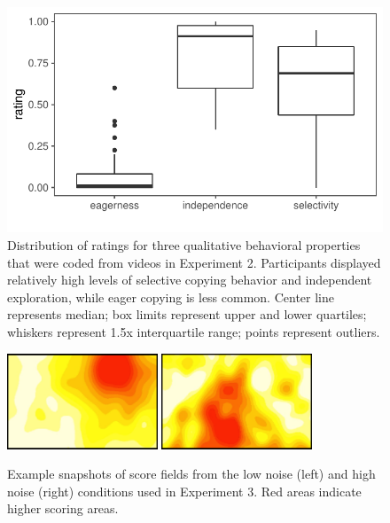 \documentclass[12pt,letterpaper]{article}
\begin{document}
\begin{figure}[t!]
    \centering
    \includegraphics[width=0.9\linewidth]{figures/coding.pdf}
    \caption{Distribution of ratings for three qualitative behavioral properties that were coded from videos in Experiment 2. Participants displayed relatively high levels of selective copying behavior and independent exploration, while eager copying is less common. Center line represents median; box limits represent upper and lower quartiles; whiskers represent 1.5x interquartile range; points represent outliers.}
    \label{fig:selective}
\end{figure}


\begin{figure}[b!]
  \centering
  \includegraphics[width=0.4\textwidth]{./figures/easy-field}
  \hspace{0.1cm}
  \includegraphics[width=0.4\textwidth]{./figures/medium-field}
  \caption{Example snapshots of score fields from the low noise (left) and high noise (right) conditions used in Experiment 3.  Red areas indicate higher scoring areas.}
  \label{fig:score_exp3}
\end{figure}
\end{document}
